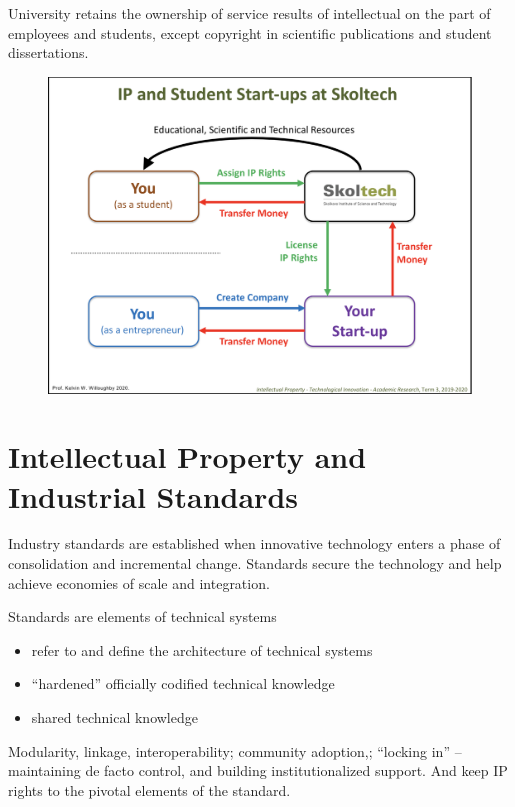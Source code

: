 \documentclass[10pt,a4paper,twocolumn]{article}
\begin{document}
University retains the ownership of service results of intellectual on the part of employees
and students, except copyright in scientific publications and student dissertations.
\begin{figure}
  \centering
  \includegraphics[width=\columnwidth]{student_and_uni.png}
\end{figure}


\section{Intellectual Property and Industrial Standards} %
\label{sec:intellectual_property_and_industrial_standards}

Industry standards are established when innovative technology enters a phase of consolidation
and incremental change. Standards secure the technology and help achieve economies of scale
and integration.

Standards are elements of technical systems
\begin{itemize}
  \item refer to and define the architecture of technical systems
  \item ``hardened'' officially codified technical knowledge
  \item shared technical knowledge
\end{itemize}
Modularity, linkage, interoperability; community adoption,; ``locking in'' -- maintaining
de facto control, and building institutionalized support. And keep IP rights to the pivotal
elements of the standard.
\end{document}
